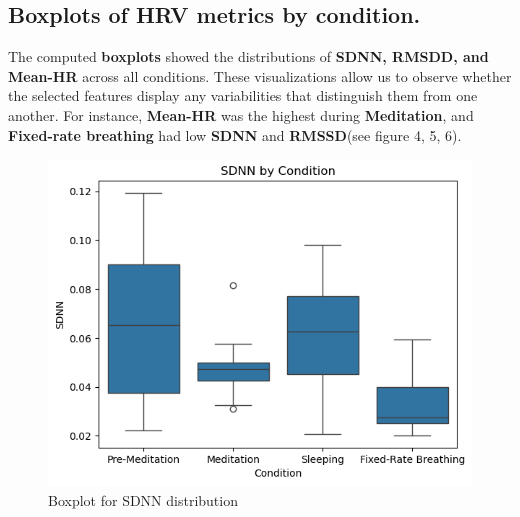 \documentclass[
  11pt,
]{ieee}
\begin{document}
\subsection{Boxplots of HRV metrics by
condition.}\label{boxplots-of-hrv-metrics-by-condition.}

\vspace{0.8em}

The computed \textbf{boxplots} showed the distributions of \textbf{SDNN,
RMSDD, and Mean-HR} across all conditions. These visualizations allow us
to observe whether the selected features display any variabilities that
distinguish them from one another. For instance, \textbf{Mean-HR} was
the highest during \textbf{Meditation}, and \textbf{Fixed-rate
breathing} had low \textbf{SDNN} and \textbf{RMSSD}(see figure 4, 5, 6).

\begin{figure}

{\centering \includegraphics{picture_use_ml/4_Boxplots of HRV Metrics by Condition_SDNN.png}

}

\caption{Boxplot for SDNN distribution}

\end{figure}%
\end{document}
